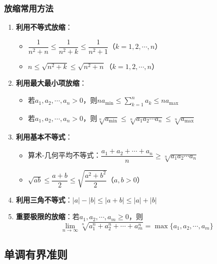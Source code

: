 \documentclass[a4paper,12pt]{article}
\begin{document}
    \subsubsection{放缩常用方法}
    \begin{enumerate}
        \item \textbf{利用不等式放缩}：
        \begin{itemize}
            \item $\dfrac{1}{n^2+n} \le \dfrac{1}{n^2+k} \le \dfrac{1}{n^2+1}$（$k = 1, 2, \cdots, n$）
            \item $n \le \sqrt{n^2+k} \le \sqrt{n^2+n}$（$k = 1, 2, \cdots, n$）
        \end{itemize}

        \item \textbf{利用最大最小项放缩}：
        \begin{itemize}
            \item 若$a_1, a_2, \cdots, a_n > 0$，则$na_{\min} \le \sum_{k=1}^{n} a_k \le na_{\max}$
            \item 若$a_1, a_2, \cdots, a_n > 0$，则$\sqrt[n]{a_{\min}} \le \sqrt[n]{a_1 a_2 \cdots a_n} \le \sqrt[n]{a_{\max}}$
        \end{itemize}

        \item \textbf{利用基本不等式}：
        \begin{itemize}
            \item 算术-几何平均不等式：$\dfrac{a_1 + a_2 + \cdots + a_n}{n} \ge \sqrt[n]{a_1 a_2 \cdots a_n}$
            \item $\sqrt{ab} \le \dfrac{a+b}{2} \le \sqrt{\dfrac{a^2+b^2}{2}}$（$a, b > 0$）
        \end{itemize}

        \item \textbf{利用三角不等式}：$|a| - |b| \le |a+b| \le |a| + |b|$

        \item \textbf{重要极限的放缩}：若$a_1, a_2, \cdots, a_m \ge 0$，则
        \[
            \lim_{n\to\infty} \sqrt[n]{a_1^n + a_2^n + \cdots + a_m^n} = \max\{a_1, a_2, \cdots, a_m\}
        \]
    \end{enumerate}

    \subsection{单调有界准则}
\end{document}
